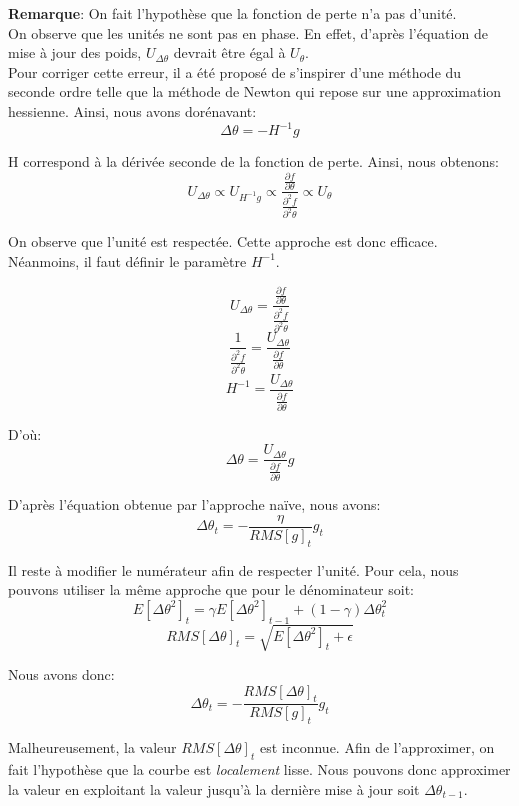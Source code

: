 \noindent \textbf{Remarque}: On fait l'hypothèse que la fonction de perte n'a pas d'unité.\\

\noindent On observe que les unités ne sont pas en phase. En effet, d'après l'équation de mise à jour des poids, $U_{\Delta \theta}$ devrait être égal à $U_\theta$.\\

\noindent Pour corriger cette erreur, il a été proposé de s'inspirer d'une méthode du seconde ordre telle que la méthode de Newton qui repose sur une approximation hessienne.
Ainsi, nous avons dorénavant:
$$\Delta \theta = -H^{-1} g$$

\noindent H correspond à la dérivée seconde de la fonction de perte. Ainsi, nous obtenons:
$$U_{\Delta \theta} \propto U_{H^{-1}g} \propto \frac{\frac{\partial f}{\partial \theta}}{\frac{\partial^2 f}{\partial^2 \theta}} \propto U_\theta$$

\noindent On observe que l'unité est respectée. Cette approche est donc efficace. Néanmoins, il faut définir le paramètre $H^{-1}$.

$$U_{\Delta \theta} = \frac{\frac{\partial f}{\partial \theta}}{\frac{\partial^2 f}{\partial^2 \theta}}$$
$$\frac{1}{\frac{\partial^2 f}{\partial^2 \theta}}=\frac{U_{\Delta \theta}}{\frac{\partial f}{\partial \theta}}$$
$$H^{-1}=\frac{U_{\Delta \theta}}{\frac{\partial f}{\partial \theta}}$$

\noindent D'où:
$$\Delta \theta =\frac{U_{\Delta \theta}}{\frac{\partial f}{\partial \theta}}g$$

\noindent D'après l'équation obtenue par l'approche naïve, nous avons:
$$\Delta \theta_t = - \dfrac{\eta}{RMS[g]_{t}} g_t$$

\noindent Il reste à modifier le numérateur afin de respecter l'unité. Pour cela, nous pouvons utiliser la même approche que pour le dénominateur soit:
$$E[\Delta \theta^2]_t = \gamma E[\Delta \theta^2]_{t-1} + (1 - \gamma) \Delta \theta^2_t$$
$$RMS[\Delta \theta]_{t} = \sqrt{E[\Delta \theta^2]_t + \epsilon}$$

\noindent Nous avons donc:
$$\Delta \theta_t = -\dfrac{RMS[\Delta \theta]_{t}}{RMS[g]_{t}} g_{t}$$

\noindent Malheureusement, la valeur $RMS[\Delta \theta]_{t}$ est inconnue. Afin de l'approximer, on fait l'hypothèse que la courbe est \textit{localement} lisse. Nous pouvons donc approximer la valeur en exploitant la valeur jusqu'à la dernière mise à jour soit $\Delta \theta_{t-1}$.

